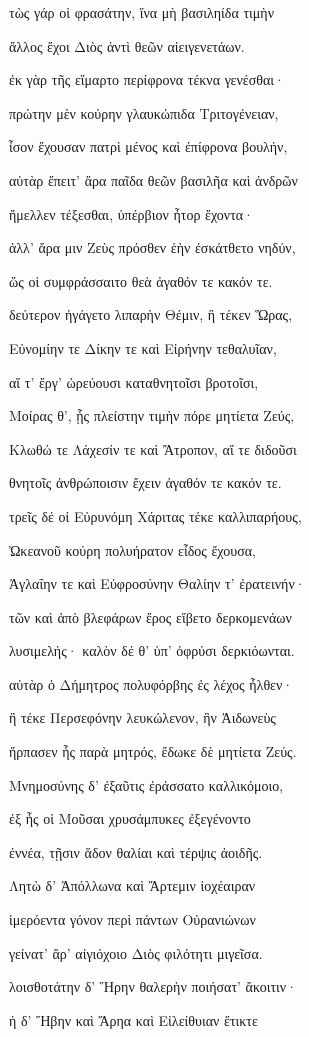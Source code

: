\begin{pages}
\begin{Leftside}
τὼς γάρ οἱ φρασάτην, ἵνα μὴ βασιληίδα τιμὴν

ἄλλος ἔχοι Διὸς ἀντὶ θεῶν αἰειγενετάων.

ἐκ γὰρ τῆς εἵμαρτο περίφρονα τέκνα γενέσθαι· 

πρώτην μὲν κούρην γλαυκώπιδα Τριτογένειαν, 

ἶσον ἔχουσαν πατρὶ μένος καὶ ἐπίφρονα βουλήν,

αὐτὰρ ἔπειτ' ἄρα παῖδα θεῶν βασιλῆα καὶ ἀνδρῶν

ἤμελλεν τέξεσθαι, ὑπέρβιον ἦτορ ἔχοντα·

ἀλλ' ἄρα μιν Ζεὺς πρόσθεν ἑὴν ἐσκάτθετο νηδύν,

ὥς οἱ συμφράσσαιτο θεὰ ἀγαθόν τε κακόν τε. 

δεύτερον ἠγάγετο λιπαρὴν Θέμιν, ἣ τέκεν Ὥρας,

Εὐνομίην τε Δίκην τε καὶ Εἰρήνην τεθαλυῖαν,

αἵ τ' ἔργ' ὠρεύουσι καταθνητοῖσι βροτοῖσι,

Μοίρας θ', ᾗς πλείστην τιμὴν πόρε μητίετα Ζεύς, 

Κλωθώ τε Λάχεσίν τε καὶ Ἄτροπον, αἵ τε διδοῦσι  

θνητοῖς ἀνθρώποισιν ἔχειν ἀγαθόν τε κακόν τε.

τρεῖς δέ οἱ Εὐρυνόμη Χάριτας τέκε καλλιπαρήους,

Ὠκεανοῦ κούρη πολυήρατον εἶδος ἔχουσα,

Ἀγλαΐην τε καὶ Εὐφροσύνην Θαλίην τ' ἐρατεινήν·

τῶν καὶ ἀπὸ βλεφάρων ἔρος εἴβετο δερκομενάων 

λυσιμελής· καλὸν δέ θ' ὑπ' ὀφρύσι δερκιόωνται. 

αὐτὰρ ὁ Δήμητρος πολυφόρβης ἐς λέχος ἦλθεν· 

ἣ τέκε Περσεφόνην λευκώλενον, ἣν Ἀιδωνεὺς

ἥρπασεν ἧς παρὰ μητρός, ἔδωκε δὲ μητίετα Ζεύς. 

Μνημοσύνης δ' ἐξαῦτις ἐράσσατο καλλικόμοιο,  

ἐξ ἧς οἱ Μοῦσαι χρυσάμπυκες ἐξεγένοντο

ἐννέα, τῇσιν ἅδον θαλίαι καὶ τέρψις ἀοιδῆς.

Λητὼ δ' Ἀπόλλωνα καὶ Ἄρτεμιν ἰοχέαιραν 

ἱμερόεντα γόνον περὶ πάντων Οὐρανιώνων

γείνατ' ἄρ' αἰγιόχοιο Διὸς φιλότητι μιγεῖσα. 

λοισθοτάτην δ' Ἥρην θαλερὴν ποιήσατ' ἄκοιτιν· 

ἡ δ' Ἥβην καὶ Ἄρηα καὶ Εἰλείθυιαν ἔτικτε 


\end{Leftside}
\end{pages}
